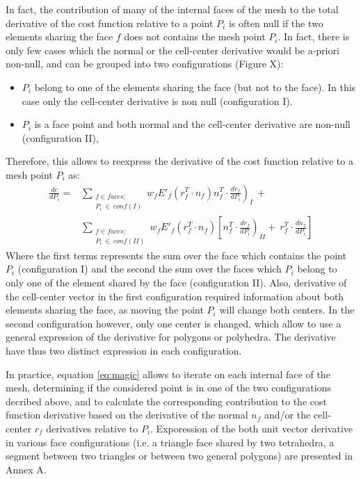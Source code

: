 \documentclass[11pt]{article}
\begin{document}
In fact, the contribution of many of the internal faces of the mesh to the total derivative of the cost function relative to a point $P_i$ is often null if the two elements sharing the face $f$ does not contains the mesh point $P_i$.
In fact, there is only few cases which the normal or the cell-center derivative would be a-priori non-null, and can be grouped into two configurations (Figure X):
\begin{itemize}
\item $P_i$ belong to one of the elements sharing the face (but not to the face).
In this case only the cell-center derivative is non null (configuration I).
\item $P_i$ is a face point and both normal and the cell-center derivative are non-null (configuration II),
\end{itemize}
Therefore, this allows to reexpress the derivative of the cost function relative to a mesh point $P_i$ as:
%
\begin{equation}
\begin{aligned}
\frac{dc}{dP_i} = 
&\sum_{\substack{f \in faces; \\ P_i\ \in \ conf(I)} } w_f E'_f\left( r_f^T \cdot n_f \right) n_f^T \cdot \left. \frac{d r_f}{dP_i}\right)_{I} \ + \\
&\sum_{\substack{f \in faces; \\ P_i\ \in \ conf(II)} } w_f E'_f\left( r_f^T \cdot n_f \right) \left[n_f^T \cdot \left. \frac{d r_f}{dP_i}\right)_{II} +\ r_f^T \cdot \frac{d n_f}{dP_i}\right]
\end{aligned}
\label{eq:magic}
\end{equation}
%
Where the first terms represents the sum over the face which contains the point $P_i$ (configuration I) and the second the sum over the faces which $P_i$ belong to only one of the element shared by the face (configuration II).
Also, derivative of the cell-center vector in the first configuration required information about both elements sharing the face, as moving the point $P_i$ will change both centers.
In the second configuration however, only one center is changed, which allow to use a general expression of the derivative for polygons or polyhedra.
The derivative have thus two distinct expression in each configuration.

In practice, equation \ref{eq:magic} allows to iterate on each internal face of the mesh, determining if the considered point is in one of the two configurations decribed above, and to calculate the corresponding contribution to the cost function derivative based on the derivative of the normal $n_f$ and/or the cell-center $r_f$ derivatives relative to $P_i$.
Exporession of the both unit vector derivative in various face configurations (i.e. a triangle face shared by two tetrahedra, a segment between two triangles or between two general polygons) are presented in Annex A.
\end{document}

